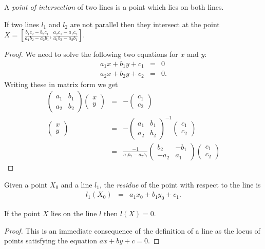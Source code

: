 \begin{definition} A \emph{point of intersection} of two lines is a point which lies on both lines.
\end{definition}
\begin{theorem}\label{th:intersect}If two lines $l_1$ and $l_2$ are not parallel then they intersect at the point $X = \left[\frac{b_1c_2 - b_2c_1}{a_1b_2 - a_2b_1}, \frac{a_2c_1 - a_1c_2}{a_1b_2 - a_2b_1}\right]$.
\end{theorem}
\begin{proof}We need to solve the following two equations for $x$ and $y$:
\begin{eqnarray*}
a_1x + b_1y + c_1 & = & 0\\
a_2x + b_2y + c_2 & = & 0.
\end{eqnarray*}
Writing these in matrix form we get
\begin{eqnarray*}
\begin{pmatrix}a_1 & b_1 \\ a_2 & b_2 \end{pmatrix}\begin{pmatrix}x \\ y \end{pmatrix} & = & -\begin{pmatrix}c_1 \\ c_2 \end{pmatrix}\\
\begin{pmatrix} x \\ y \end{pmatrix} & = & -\begin{pmatrix} a_1 & b_1 \\ a_2 & b_2 \end{pmatrix}^{-1}\begin{pmatrix}c_1 \\ c_2 \end{pmatrix}\\
 & = & \frac{-1}{a_1b_2 - a_2b_1}\begin{pmatrix} b_2 & -b_1 \\ -a_2 & a_1 \end{pmatrix}\begin{pmatrix}c_1 \\ c_2 \end{pmatrix}
\end{eqnarray*}
\end{proof}

\begin{definition} Given a point $X_0$ and a line $l_1$, the \emph{residue} of the point with respect to the line is
\begin{eqnarray}
l_1(X_0) & = & a_1x_0 + b_1y_0 + c_1.
\end{eqnarray}
\end{definition}
\begin{corollary}If the point $X$ lies on the line $l$ then $l(X) = 0$.
\end{corollary}
\begin{proof}
This is an immediate consequence of the definition of a line as the locus of points satisfying the equation $ax + by + c = 0$.
\end{proof}

